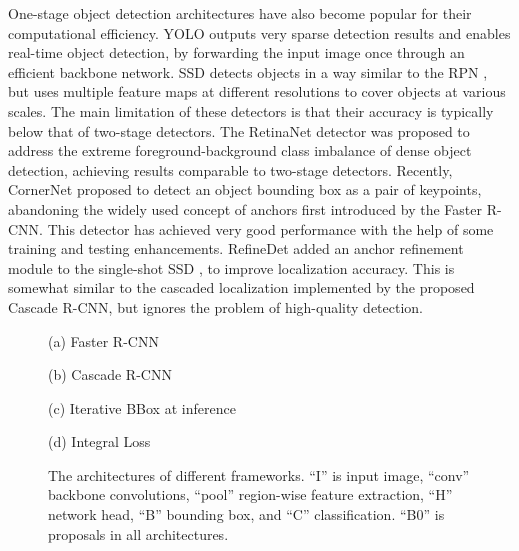 \documentclass[10pt,journal,compsoc]{IEEEtran}
\begin{document}
One-stage object detection architectures have also become popular
for their computational efficiency. YOLO \cite{DBLP:conf/cvpr/RedmonDGF16}
outputs very sparse detection results and enables real-time
object detection, by forwarding the input image once through an efficient
backbone network. SSD \cite{DBLP:conf/eccv/LiuAESRFB16}
detects objects in a way similar to the RPN \cite{DBLP:conf/nips/RenHGS15},
but uses multiple feature maps at different resolutions to cover objects at
various scales. The main limitation of these detectors is that their
accuracy is typically below that of two-stage detectors.
The RetinaNet \cite{lin2017focal} detector was proposed to address the extreme
foreground-background class imbalance of dense object detection,
achieving results  comparable to two-stage detectors. Recently,
CornerNet \cite{DBLP:conf/eccv/LawD18} proposed to detect an object bounding
box as a pair of keypoints, abandoning the widely used concept of anchors
first introduced by the Faster R-CNN. This detector has achieved very good
performance with the help of some training and testing enhancements.
RefineDet \cite{zhang2018single} added an anchor
refinement module to the single-shot SSD \cite{DBLP:conf/eccv/LiuAESRFB16},
to improve localization accuracy. This is somewhat similar to the cascaded
localization implemented by the proposed Cascade R-CNN, but ignores the
problem of high-quality detection.

\begin{figure*}[!t]
\begin{minipage}[b]{.17\linewidth}
\centering
\centerline{}{(a) Faster R-CNN}
\end{minipage}
\hfill
\begin{minipage}[b]{.3\linewidth}
\centering
\centerline{}{(b) Cascade R-CNN}
\end{minipage}
\hfill
\begin{minipage}[b]{.3\linewidth}
\centering
\centerline{}{(c) Iterative BBox at inference}
\end{minipage}
\hfill
\begin{minipage}[b]{.21\linewidth}
\centering
\centerline{}{(d) Integral Loss}
\end{minipage}
\caption{The architectures of different frameworks. ``I'' is input image, ``conv'' backbone convolutions, ``pool'' region-wise feature extraction, ``H'' network head, ``B'' bounding box, and ``C'' classification. ``B0'' is proposals in all architectures.}
\label{fig:framework}
\end{figure*}
\end{document}
